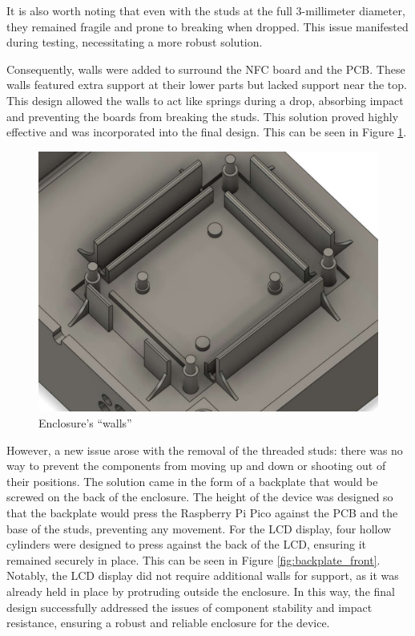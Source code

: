 It is also worth noting that even with the studs at the full 3-millimeter diameter, they remained 
fragile and prone to breaking when dropped. This issue manifested during testing, necessitating a 
more robust solution.

Consequently, walls were added to surround the NFC board and the PCB. These walls featured extra 
support at their lower parts but lacked support near the top. This design allowed the walls to 
act like springs during a drop, absorbing impact and preventing the boards from breaking the 
studs. This solution proved highly effective and was incorporated into the final design. This 
can be seen in Figure \ref{fig:enclosure_walls}.

\begin{figure}[h]
	\centering
	\includegraphics[width = .5\textwidth]{Imagenes/Vectorial/enclosure_walls.pdf}
	\caption{Enclosure's ``walls''}
	\label{fig:enclosure_walls}
\end{figure}

However, a new issue arose with the removal of the threaded studs: there was no way to prevent the 
components from moving up and down or shooting out of their positions. The solution came in the 
form of a backplate that would be screwed on the back of the enclosure. The height of the 
device was designed so that the backplate would press the Raspberry Pi Pico against the PCB and 
the base of the studs, preventing any movement. For the LCD display, four hollow cylinders were 
designed to press against the back of the LCD, ensuring it remained securely in place. This can be 
seen in Figure \ref{fig:backplate_front}. Notably, the LCD display did not require additional 
walls for support, as it was already held in place by protruding outside the enclosure. In this 
way, the final design successfully addressed the issues of component stability and impact 
resistance, ensuring a robust and reliable enclosure for the device.

